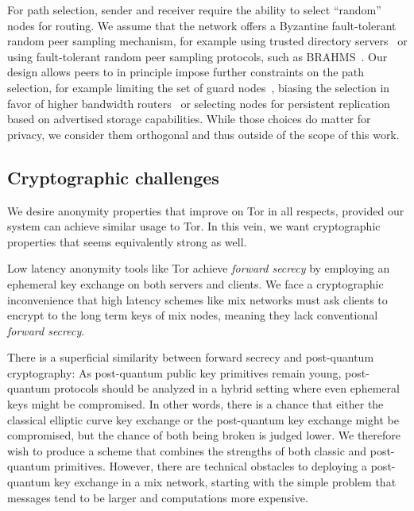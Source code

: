 \documentclass[twoside,letterpaper]{llncs}
\begin{document}
For path selection, sender and receiver require the ability to select
``random'' nodes for routing.  We assume that the network offers a
Byzantine fault-tolerant random peer sampling mechanism, for example
using trusted directory servers~\cite{tordir} or using fault-tolerant
random peer sampling protocols, such as BRAHMS~\cite{brahms}.  Our
design allows peers to in principle impose further constraints on the
path selection, for example limiting the set of guard
nodes~\cite{oneguardisenough}, biasing the selection in favor of
higher bandwidth routers~\cite{findexample} or selecting nodes for
persistent replication based on advertised storage capabilities.
While those choices do matter for privacy, we consider them orthogonal
and thus outside of the scope of this work.

\subsection{Cryptographic challenges}

We desire anonymity properties that improve on Tor in all respects,
provided our system can achieve similar usage to Tor.  In this vein,
we want cryptographic properties that seems equivalently strong as well.

Low latency anonymity tools like Tor achieve {\em forward secrecy}
by employing an ephemeral key exchange on both servers and clients.
We face a cryptographic inconvenience that high latency schemes
like mix networks must ask clients to encrypt to the long term keys
of mix nodes, meaning they lack conventional {\em forward secrecy}.  

There is a superficial similarity between forward secrecy and
post-quantum cryptography: As post-quantum public key primitives
remain young, post-quantum protocols should be analyzed in a hybrid
setting where even ephemeral keys might be compromised.  In other
words, there is a chance that either the classical elliptic curve key
exchange or the post-quantum key exchange might be compromised, but
the chance of both being broken is judged lower.  We therefore wish
to produce a scheme that combines the strengths of both classic and
post-quantum primitives.  However, there are technical obstacles to
deploying a post-quantum key exchange in a mix network, starting with
the simple problem that messages tend to be larger
and computations more expensive.
\end{document}
